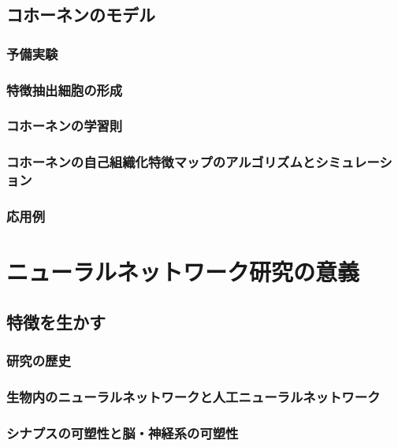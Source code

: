 \documentclass[uplatex, 11pt, a4j, dvipdfmx]{jsarticle}
\begin{document}
    \subsection{コホーネンのモデル}
      \subsubsection{予備実験}
      \subsubsection{特徴抽出細胞の形成} %
      \subsubsection{コホーネンの学習則} %
      \subsubsection{コホーネンの自己組織化特徴マップのアルゴリズムとシミュレーション} %
      \subsubsection{応用例} %


  \section{ニューラルネットワーク研究の意義}
    \subsection{特徴を生かす}
      \subsubsection{研究の歴史}
      \subsubsection{生物内のニューラルネットワークと人工ニューラルネットワーク}
      \subsubsection{シナプスの可塑性と脳・神経系の可塑性}
\end{document}
